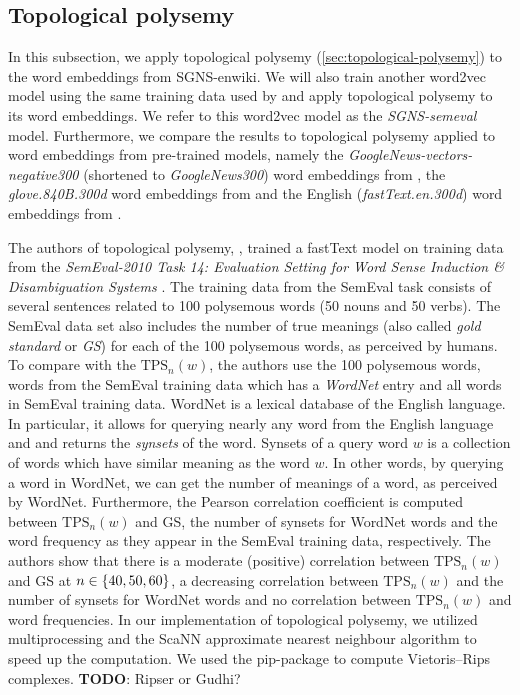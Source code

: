 \subsection{Topological polysemy}
\label{sec:analysis-of-embeddings-topological-polysemy}
In this subsection, we apply topological polysemy (\cref{sec:topological-polysemy}) to the word embeddings from SGNS-enwiki. We will also train another word2vec model using the same training data used by \cite{jakubowski2020topology} and apply topological polysemy to its word embeddings. We refer to this word2vec model as the \textit{SGNS-semeval} model. Furthermore, we compare the results to topological polysemy applied to word embeddings from pre-trained models, namely the \textit{GoogleNews-vectors-negative300} (shortened to \textit{GoogleNews300}) word embeddings from \cite{GoogleCodeArchiveWord2vec}, the \textit{glove.840B.300d} word embeddings from \cite{GloVeProject2014} and the English (\textit{fastText.en.300d}) word embeddings from \cite{grave2018learning}.

The authors of topological polysemy, \cite{jakubowski2020topology}, trained a fastText model on training data from the \textit{SemEval-2010 Task 14: Evaluation Setting for Word Sense Induction \& Disambiguation Systems} \cite{manandhar-klapaftis-2009-semeval}. The training data from the SemEval task consists of several sentences related to 100 polysemous words (50 nouns and 50 verbs). The SemEval data set also includes the number of true meanings (also called \textit{gold standard} or \textit{GS}) for each of the 100 polysemous words, as perceived by humans. To compare with the $\text{TPS}_n(w)$, the authors use the 100 polysemous words, words from the SemEval training data which has a \textit{WordNet} \cite{fellbaum1998} entry and all words in SemEval training data. WordNet is a lexical database of the English language. In particular, it allows for querying nearly any word from the English language and and returns the \textit{synsets} of the word. Synsets of a query word $w$ is a collection of words which have similar meaning as the word $w$. In other words, by querying a word in WordNet, we can get the number of meanings of a word, as perceived by WordNet. Furthermore, the Pearson correlation coefficient \cite{James2013} is computed between $\text{TPS}_n(w)$ and GS, the number of synsets for WordNet words and the word frequency as they appear in the SemEval training data, respectively. The authors show that there is a moderate (positive) correlation between $\text{TPS}_n(w)$ and GS at $n \in \left\{40, 50, 60\right\}$, a decreasing correlation between $\text{TPS}_n(w)$ and the number of synsets for WordNet words and no correlation between $\text{TPS}_n(w)$ and word frequencies. In our implementation of topological polysemy, we utilized multiprocessing and the ScaNN \cite{scann2020} approximate nearest neighbour algorithm to speed up the computation. We used the  \cite{ctralie2018ripser} pip-package to compute Vietoris–Rips complexes. \textbf{TODO}: Ripser or Gudhi?

